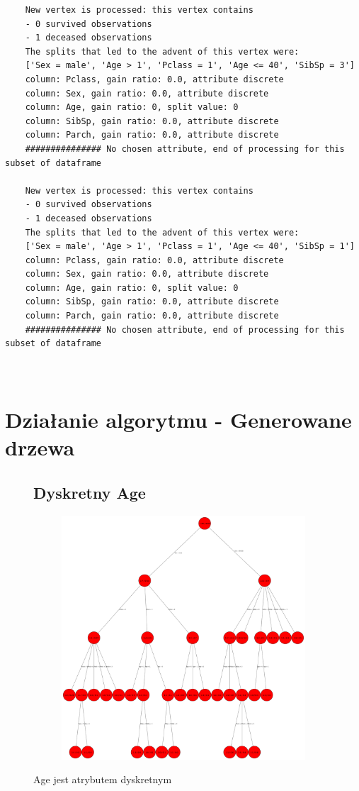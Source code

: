 \documentclass[12pt]{article}
\begin{document}
\begin{verbatim}
	New vertex is processed: this vertex contains
	- 0 survived observations
	- 1 deceased observations
	The splits that led to the advent of this vertex were:
	['Sex = male', 'Age > 1', 'Pclass = 1', 'Age <= 40', 'SibSp = 3']
	column: Pclass, gain ratio: 0.0, attribute discrete
	column: Sex, gain ratio: 0.0, attribute discrete
	column: Age, gain ratio: 0, split value: 0
	column: SibSp, gain ratio: 0.0, attribute discrete
	column: Parch, gain ratio: 0.0, attribute discrete
	############### No chosen attribute, end of processing for this subset of dataframe
	
	New vertex is processed: this vertex contains
	- 0 survived observations
	- 1 deceased observations
	The splits that led to the advent of this vertex were:
	['Sex = male', 'Age > 1', 'Pclass = 1', 'Age <= 40', 'SibSp = 1']
	column: Pclass, gain ratio: 0.0, attribute discrete
	column: Sex, gain ratio: 0.0, attribute discrete
	column: Age, gain ratio: 0, split value: 0
	column: SibSp, gain ratio: 0.0, attribute discrete
	column: Parch, gain ratio: 0.0, attribute discrete
	############### No chosen attribute, end of processing for this subset of dataframe
	
	
\end{verbatim}
\section{Działanie algorytmu - Generowane drzewa}

\begin{figure}[h!]
	\subsection{Dyskretny Age}
	\centering
	\begin{subfigure}[b]{1\linewidth}
		\includegraphics[width=\linewidth]{Dyskretny.png}
	\end{subfigure}
	\label{fig:dyskretne}
	\caption{Age jest atrybutem dyskretnym}
\end{figure}
\end{document}
